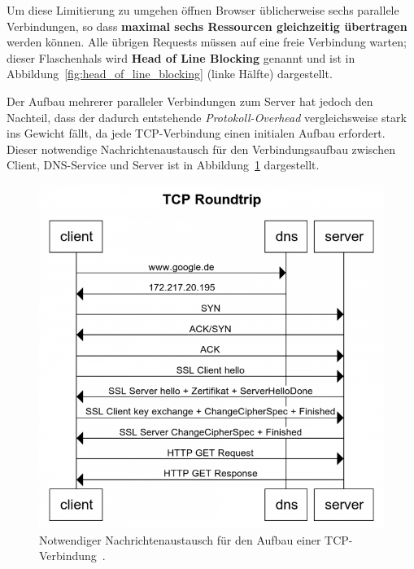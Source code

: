 \documentclass[a4paper, justified, notoc]{tufte-handout} %
\begin{document}
Um diese Limitierung zu umgehen öffnen Browser üblicherweise sechs parallele Verbindungen, so dass \textbf{maximal sechs Ressourcen gleichzeitig übertragen} werden können. Alle übrigen Requests müssen auf eine freie Verbindung warten; dieser Flaschenhals wird \textbf{Head of Line Blocking} genannt und ist in Abbildung~\ref{fig:head_of_line_blocking} (linke Hälfte) dargestellt.

Der Aufbau mehrerer paralleler Verbindungen zum Server hat jedoch den Nachteil, dass der dadurch entstehende \emph{Protokoll-Overhead} vergleichsweise stark ins Gewicht fällt, da jede TCP-Verbindung einen initialen Aufbau erfordert. Dieser notwendige Nachrichtenaustausch für den Verbindungsaufbau zwischen Client, DNS-Service und Server ist in Abbildung~\ref{fig:tcp_roundtrip} dargestellt.

\begin{figure}%
	\centering
  \includegraphics[width=1\textwidth]{./figures/tcp_verbindungsaufbau.png}
  \caption{Notwendiger Nachrichtenaustausch für den Aufbau einer TCP-Verbindung~\citep{weinschenkler:2017}.}
  \label{fig:tcp_roundtrip}
\end{figure}
 
\end{document}

